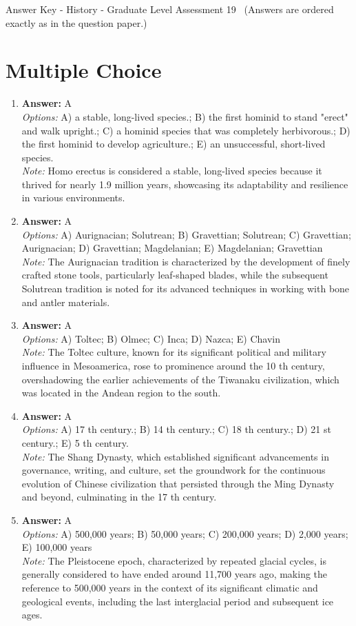 \documentclass[12pt]{article}
\begin{document}
\begin{center}
Answer Key - History - Graduate Level Assessment 19 \
\small (Answers are ordered exactly as in the question paper.)
\end{center}

\section*{Multiple Choice}
\begin{enumerate}[label=\arabic*.]
\item \textbf{Answer:} A
\\ \textit{Options:} A) a stable, long-lived species.; B) the first hominid to stand "erect" and walk upright.; C) a hominid species that was completely herbivorous.; D) the first hominid to develop agriculture.; E) an unsuccessful, short-lived species.
\\ \textit{Note:} Homo erectus is considered a stable, long-lived species because it thrived for nearly 1.9 million years, showcasing its adaptability and resilience in various environments.
\item \textbf{Answer:} A
\\ \textit{Options:} A) Aurignacian; Solutrean; B) Gravettian; Solutrean; C) Gravettian; Aurignacian; D) Gravettian; Magdelanian; E) Magdelanian; Gravettian
\\ \textit{Note:} The Aurignacian tradition is characterized by the development of finely crafted stone tools, particularly leaf-shaped blades, while the subsequent Solutrean tradition is noted for its advanced techniques in working with bone and antler materials.
\item \textbf{Answer:} A
\\ \textit{Options:} A) Toltec; B) Olmec; C) Inca; D) Nazca; E) Chavin
\\ \textit{Note:} The Toltec culture, known for its significant political and military influence in Mesoamerica, rose to prominence around the 10 th century, overshadowing the earlier achievements of the Tiwanaku civilization, which was located in the Andean region to the south.
\item \textbf{Answer:} A
\\ \textit{Options:} A) 17 th century.; B) 14 th century.; C) 18 th century.; D) 21 st century.; E) 5 th century.
\\ \textit{Note:} The Shang Dynasty, which established significant advancements in governance, writing, and culture, set the groundwork for the continuous evolution of Chinese civilization that persisted through the Ming Dynasty and beyond, culminating in the 17 th century.
\item \textbf{Answer:} A
\\ \textit{Options:} A) 500,000 years; B) 50,000 years; C) 200,000 years; D) 2,000 years; E) 100,000 years
\\ \textit{Note:} The Pleistocene epoch, characterized by repeated glacial cycles, is generally considered to have ended around 11,700 years ago, making the reference to 500,000 years in the context of its significant climatic and geological events, including the last interglacial period and subsequent ice ages.
\end{enumerate}
\end{document}
